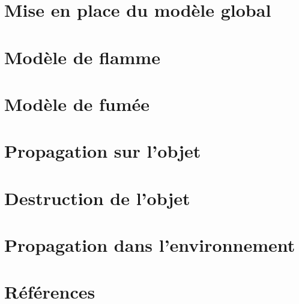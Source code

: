 \documentclass[a4paper,10pt]{article}
\begin{document}
\section{Mise en place du modèle global}




\section{Modèle de flamme}





\section{Modèle de fumée}





\section{Propagation sur l'objet}





\section{Destruction de l'objet}





\section{Propagation dans l'environnement}


\section{Références}


\end{document}
